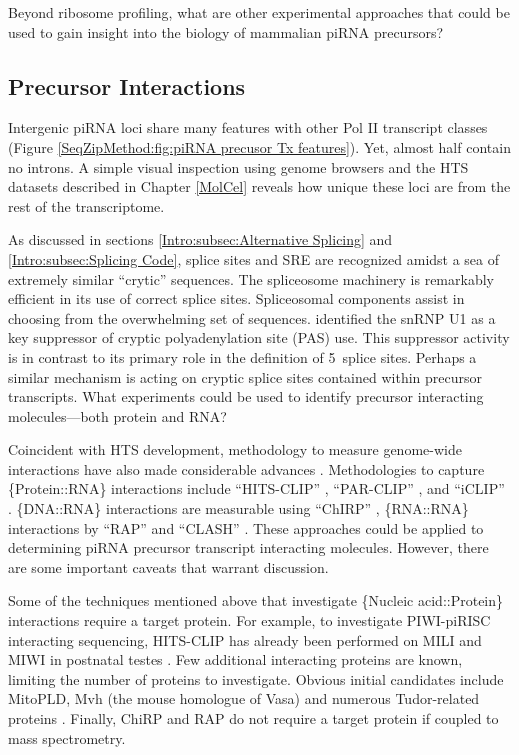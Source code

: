     Beyond ribosome profiling, what are other experimental approaches that could be used to gain insight into the biology of mammalian piRNA precursors?

  \subsection{Precursor Interactions}
    \label{Disc:subsec:Labeling of precursors}


    Intergenic piRNA loci share many features with other Pol II transcript classes (Figure \ref{SeqZipMethod:fig:piRNA precusor Tx features}). Yet, almost half contain no introns. A simple visual inspection using genome browsers and the HTS datasets described in Chapter \ref{MolCel} reveals how unique these loci are from the rest of the transcriptome.

    As discussed in sections \ref{Intro:subsec:Alternative Splicing} and \ref{Intro:subsec:Splicing Code}, splice sites and SRE are recognized amidst a sea of extremely similar ``crytic'' sequences. The spliceosome machinery is remarkably efficient in its use of correct splice sites. Spliceosomal components assist in choosing from the overwhelming set of sequences. \citet{Berg2012} identified the snRNP U1 as a key suppressor of cryptic polyadenylation site (PAS) use. This suppressor activity is in contrast to its primary role in the definition of 5\textprime~splice sites. Perhaps a similar mechanism is acting on cryptic splice sites contained within precursor transcripts. What experiments could be used to identify precursor interacting molecules---both protein and RNA?

    Coincident with HTS development, methodology to measure genome-wide interactions have also made considerable advances \citep{Konig2011}. Methodologies to capture \{Protein::RNA\} interactions include ``HITS-CLIP'' \citep{Licatalosi2008}, ``PAR-CLIP'' \citep{Hafner2010}, and ``iCLIP'' \citep{Konig2010}. \{DNA::RNA\} interactions are measurable using ``ChIRP'' \citep{Chu2012}, \{RNA::RNA\} interactions by ``RAP'' and ``CLASH'' \citep{Engreitz2013,Helwak2014}. These approaches could be applied to determining piRNA precursor transcript interacting molecules. However, there are some important caveats that warrant discussion.

    Some of the techniques mentioned above that investigate \{Nucleic acid::Protein\} interactions require a target protein. For example, to investigate PIWI-piRISC interacting sequencing, HITS-CLIP has already been performed on MILI and MIWI in postnatal testes \citep{Vourekas2012}. Few additional interacting proteins are known, limiting the number of proteins to investigate. Obvious initial candidates include MitoPLD, Mvh \citep{Lasko2013} (the mouse homologue of Vasa) and numerous Tudor-related proteins \citep{Chen2011}. Finally, ChiRP and RAP do not require a target protein if coupled to mass spectrometry.


